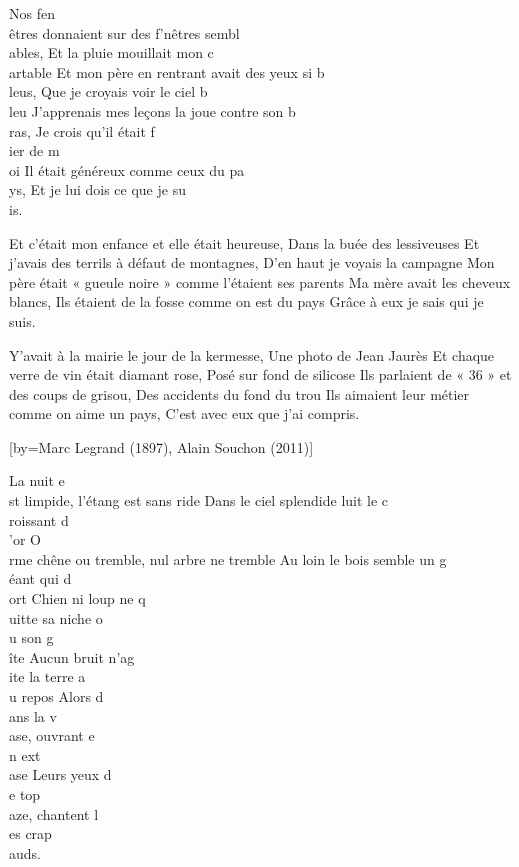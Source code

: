 \beginverse
Nos fen\\[Mim]êtres donnaient sur des f'nêtres sembl\\[Ré]ables,
Et la pluie mouillait mon c\\[Mim]artable
Et mon père en rentrant avait des yeux si b\\[Ré]leus,
Que je croyais voir le ciel b\\[Sol]leu
J'apprenais mes leçons la joue contre son b\\[Ré]ras,
Je crois qu'il était f\\[Si7]ier de m\\[Mim]oi
Il était généreux comme ceux du pa\\[Ré]ys,
Et je lui dois ce que je su\\[Si7]is.
\endverse

\beginverse
Et c'était mon enfance et elle était heureuse,
Dans la buée des lessiveuses
Et j'avais des terrils à défaut de montagnes,
D'en haut je voyais la campagne
Mon père était « gueule noire » comme l'étaient ses parents
Ma mère avait les cheveux blancs,
Ils étaient de la fosse comme on est du pays
Grâce à eux je sais qui je suis.
\endverse

\beginverse
Y'avait à la mairie le jour de la kermesse,
Une photo de Jean Jaurès
Et chaque verre de vin était diamant rose,
Posé sur fond de silicose
Ils parlaient de « 36 » et des coups de grisou,
Des accidents du fond du trou
Ils aimaient leur métier comme on aime un pays,
C'est avec eux que j'ai compris.
\endverse

[by={Marc Legrand (1897), Alain Souchon (2011)}]

\beginverse
La nuit e\\[Do]st limpide, l'étang est sans ride
Dans le ciel splendide luit le c\\[Sol]roissant d\\[Do]'or
O\\[Do]rme chêne ou tremble, nul arbre ne tremble
Au loin le bois semble un g\\[Sol]éant qui d\\[Do]ort
Chien ni loup ne q\\[Fa]uitte sa niche o\\[Sol]u son g\\[Do]îte
Aucun bruit n'ag\\[Fa]ite la terre a\\[Sol]u repos
Alors d\\[Do]ans la v\\[Fa]ase, ouvrant e\\[Sol]n ext\\[Do]ase
Leurs yeux d\\[Lam]e top\\[Rém]aze, chantent l\\[Sol]es crap\\[Do]auds.
\endverse

